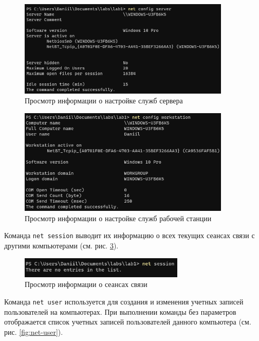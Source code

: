 \documentclass[a4paper, 14pt]{extarticle}
\begin{document}
\begin{figure}[H]
  \centering
  \includegraphics[width=0.9\textwidth]{images/net/config-server.png}
  \caption{Просмотр информации о настройке служб сервера}
  \label{fig:net-config-server}
\end{figure}

\begin{figure}[H]
  \centering
  \includegraphics[width=0.9\textwidth]{images/net/config-workstation.png}
  \caption{Просмотр информации о настройке служб рабочей станции}
  \label{fig:net-config-workstation}
\end{figure}

Команда \texttt{net session} выводит их информацию о всех текущих сеансах связи
с другими компьютерами (см. рис. \ref{fig:net-session}).

\begin{figure}[H]
  \centering
  \includegraphics[width=0.7\textwidth]{images/net/session.png}
  \caption{Просмотр информации о сеансах связи}
  \label{fig:net-session}
\end{figure}

Команда \texttt{net user} используется для создания и изменения учетных записей
пользователей на компьютерах. При выполнении команды без параметров
отображается список учетных записей пользователей данного компьютера (см. рис.
\ref{fig:net-user}).
\end{document}
